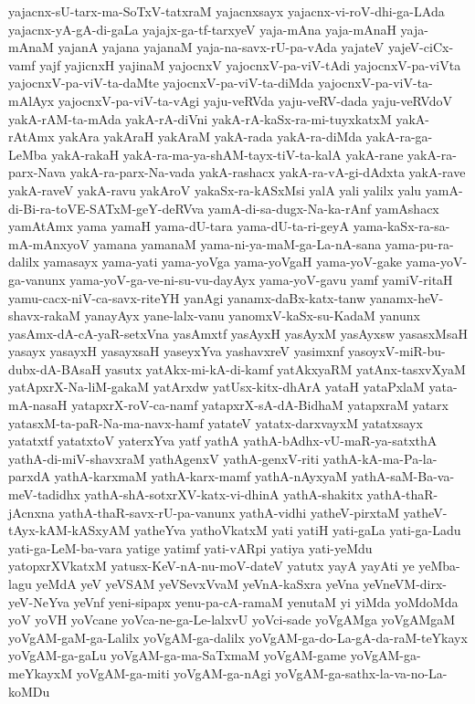 {yajacnx-sU-tarx-ma-SoTxV-tatxraM
yajacnxsayx
yajacnx-vi-roV-dhi-ga-LAda
yajacnx-yA-gA-di-gaLa
yajajx-ga-tf-tarxyeV
yaja-mAna
yaja-mAnaH
yaja-mAnaM
yajanA
yajana
yajanaM
yaja-na-savx-rU-pa-vAda
yajateV
yajeV-ciCx-vamf
yajf
yajicnxH
yajinaM
yajocnxV
yajocnxV-pa-viV-tAdi
yajocnxV-pa-viVta
yajocnxV-pa-viV-ta-daMte
yajocnxV-pa-viV-ta-diMda
yajocnxV-pa-viV-ta-mAlAyx
yajocnxV-pa-viV-ta-vAgi
yaju-veRVda
yaju-veRV-dada
yaju-veRVdoV
yakA-rAM-ta-mAda
yakA-rA-diVni
yakA-rA-kaSx-ra-mi-tuyxkatxM
yakA-rAtAmx
yakAra
yakAraH
yakAraM
yakA-rada
yakA-ra-diMda
yakA-ra-ga-LeMba
yakA-rakaH
yakA-ra-ma-ya-shAM-tayx-tiV-ta-kalA
yakA-rane
yakA-ra-parx-Nava
yakA-ra-parx-Na-vada
yakA-rashacx
yakA-ra-vA-gi-dAdxta
yakA-rave
yakA-raveV
yakA-ravu
yakAroV
yakaSx-ra-kASxMsi
yalA
yali
yalilx
yalu
yamA-di-Bi-ra-toVE-SATxM-geY-deRVva
yamA-di-sa-dugx-Na-ka-rAnf
yamAshacx
yamAtAmx
yama
yamaH
yama-dU-tara
yama-dU-ta-ri-geyA
yama-kaSx-ra-sa-mA-mAnxyoV
yamana
yamanaM
yama-ni-ya-maM-ga-La-nA-sana
yama-pu-ra-dalilx
yamasayx
yama-yati
yama-yoVga
yama-yoVgaH
yama-yoV-gake
yama-yoV-ga-vanunx
yama-yoV-ga-ve-ni-su-vu-dayAyx
yama-yoV-gavu
yamf
yamiV-ritaH
yamu-cacx-niV-ca-savx-riteYH
yanAgi
yanamx-daBx-katx-tanw
yanamx-heV-shavx-rakaM
yanayAyx
yane-lalx-vanu
yanomxV-kaSx-su-KadaM
yanunx
yasAmx-dA-cA-yaR-setxVna
yasAmxtf
yasAyxH
yasAyxM
yasAyxsw
yasasxMsaH
yasayx
yasayxH
yasayxsaH
yaseyxYva
yashavxreV
yasimxnf
yasoyxV-miR-bu-dubx-dA-BAsaH
yasutx
yatAkx-mi-kA-di-kamf
yatAkxyaRM
yatAnx-tasxvXyaM
yatApxrX-Na-liM-gakaM
yatArxdw
yatUsx-kitx-dhArA
yataH
yataPxlaM
yata-mA-nasaH
yatapxrX-roV-ca-namf
yatapxrX-sA-dA-BidhaM
yatapxraM
yatarx
yatasxM-ta-paR-Na-ma-navx-hamf
yatateV
yatatx-darxvayxM
yatatxsayx
yatatxtf
yatatxtoV
yaterxYva
yatf
yathA
yathA-bAdhx-vU-maR-ya-satxthA
yathA-di-miV-shavxraM
yathAgenxV
yathA-genxV-riti
yathA-kA-ma-Pa-la-parxdA
yathA-karxmaM
yathA-karx-mamf
yathA-nAyxyaM
yathA-saM-Ba-va-meV-tadidhx
yathA-shA-sotxrXV-katx-vi-dhinA
yathA-shakitx
yathA-thaR-jAcnxna
yathA-thaR-savx-rU-pa-vanunx
yathA-vidhi
yatheV-pirxtaM
yatheV-tAyx-kAM-kASxyAM
yatheYva
yathoVkatxM
yati
yatiH
yati-gaLa
yati-ga-Ladu
yati-ga-LeM-ba-vara
yatige
yatimf
yati-vARpi
yatiya
yati-yeMdu
yatopxrXVkatxM
yatusx-KeV-nA-nu-moV-dateV
yatutx
yayA
yayAti
ye
yeMba-lagu
yeMdA
yeV
yeVSAM
yeVSevxVvaM
yeVnA-kaSxra
yeVna
yeVneVM-dirx-yeV-NeYva
yeVnf
yeni-sipapx
yenu-pa-cA-ramaM
yenutaM
yi
yiMda
yoMdoMda
yoV
yoVH
yoVcane
yoVca-ne-ga-Le-lalxvU
yoVci-sade
yoVgAMga
yoVgAMgaM
yoVgAM-gaM-ga-Lalilx
yoVgAM-ga-dalilx
yoVgAM-ga-do-La-gA-da-raM-teYkayx
yoVgAM-ga-gaLu
yoVgAM-ga-ma-SaTxmaM
yoVgAM-game
yoVgAM-ga-meYkayxM
yoVgAM-ga-miti
yoVgAM-ga-nAgi
yoVgAM-ga-sathx-la-va-no-La-koMDu
}
